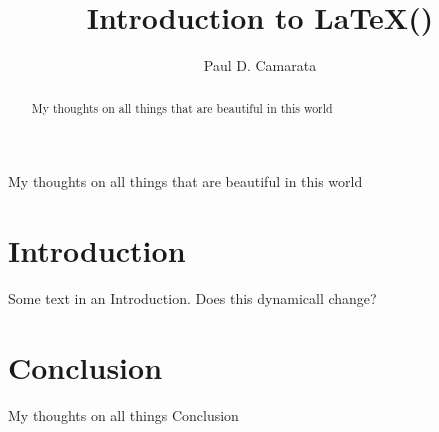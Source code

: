 \documentclass{memoir}
\begin{document}
\title{Introduction to LaTeX()}
\author{Paul D. Camarata}

\maketitle

\frontmatter
\tableofcontents*

\mainmatter
\begin{abstract}
    My thoughts on all things that are beautiful in this world
    
\end{abstract}
My thoughts on all things that are beautiful in this world

\section{Introduction}
Some text in an Introduction. Does this dynamicall change?

\section{Conclusion}
My thoughts on all things Conclusion
\end{document}
